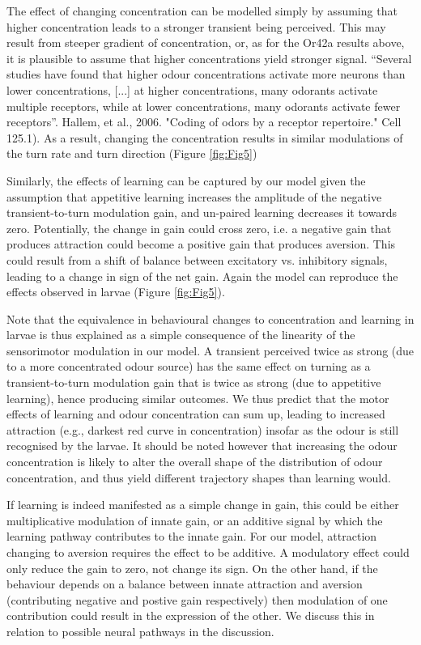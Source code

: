 \documentclass[10pt,a4paper]{article}
\begin{document}
The effect of changing concentration can be modelled simply by assuming that higher concentration leads to a stronger transient being perceived. This may result from steeper gradient of concentration, or, as for the Or42a results above, it is plausible to assume that higher concentrations yield stronger signal.  “Several studies have found that higher odour concentrations activate more neurons than lower concentrations, [...] at higher concentrations, many odorants activate multiple receptors, while at lower concentrations, many odorants activate fewer receptors”. Hallem, et al., 2006. "Coding of odors by a receptor repertoire." Cell 125.1). As a result, changing the concentration results in similar modulations of the turn rate and turn direction (Figure \ref{fig:Fig5})

Similarly, the effects of learning can be captured by our model given the assumption that appetitive learning increases the amplitude of the negative transient-to-turn modulation gain, and un-paired learning decreases it towards zero. Potentially, the change in gain could cross zero, i.e. a negative gain that produces attraction could become a positive gain that produces aversion. This could result from a shift of balance between excitatory vs. inhibitory signals, leading to a change in sign of the net gain. Again the model can reproduce the effects observed in larvae (Figure \ref{fig:Fig5}). 

Note that the equivalence in behavioural changes to concentration and learning in larvae is thus explained as a simple consequence of the linearity of the sensorimotor modulation in our model. A transient perceived twice as strong (due to a more concentrated odour source) has the same effect on turning as a transient-to-turn modulation gain that is twice as strong (due to appetitive learning), hence producing similar outcomes. We thus predict that the motor effects of learning and odour concentration can sum up, leading to increased attraction (e.g., darkest red curve in concentration) insofar as the odour is still recognised by the larvae. It should be noted however that increasing the odour concentration is likely to alter the overall shape of the distribution of odour concentration, and thus yield different trajectory shapes than learning would.

If learning is indeed manifested as a simple change in gain, this could be either multiplicative modulation of innate gain, or an additive signal by which the learning pathway contributes to the innate gain. For our model, attraction changing to aversion requires the effect to be additive. A modulatory effect could only reduce the gain to zero, not change its sign. On the other hand, if the behaviour depends on a balance between innate attraction and aversion (contributing negative and postive gain respectively) then modulation of one contribution could result in the expression of the other. We discuss this in relation to possible neural pathways in the discussion.
\end{document}
